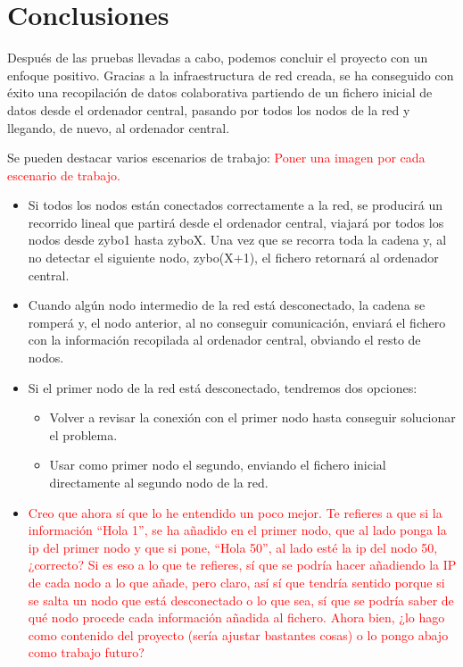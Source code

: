 \section{Conclusiones}
Después de las pruebas llevadas a cabo, podemos concluir el proyecto con un enfoque positivo. Gracias a la infraestructura de red creada, se ha conseguido con éxito una recopilación de datos colaborativa partiendo de un fichero inicial de datos desde el ordenador central, pasando por todos los nodos de la red y llegando, de nuevo, al ordenador central.

Se pueden destacar varios escenarios de trabajo: \textcolor{red}{Poner una imagen por cada escenario de trabajo.}
\begin{itemize}
	\item Si todos los nodos están conectados correctamente a la red, se producirá un recorrido lineal que partirá desde el ordenador central, viajará por todos los nodos desde zybo1 hasta zyboX. Una vez que se recorra toda la cadena y, al no detectar el siguiente nodo, zybo(X+1), el fichero retornará al ordenador central.
	\item Cuando algún nodo intermedio de la red está desconectado, la cadena se romperá y, el nodo anterior, al no conseguir comunicación, enviará el fichero con la información recopilada al ordenador central, obviando el resto de nodos.
	\item Si el primer nodo de la red está desconectado, tendremos dos opciones:
	\begin{itemize}
		\item Volver a revisar la conexión con el primer nodo hasta conseguir solucionar el problema.
		\item Usar como primer nodo el segundo, enviando el fichero inicial directamente al segundo nodo de la red.
	\end{itemize}
	\item \textcolor{red}{Creo que ahora sí que lo he entendido un poco mejor. Te refieres a que si la información ``Hola 1'', se ha añadido en el primer nodo, que al lado ponga la ip del primer nodo y que si pone, ``Hola 50'', al lado esté la ip del nodo 50, ¿correcto? Si es eso a lo que te refieres, sí que se podría hacer añadiendo la IP de cada nodo a lo que añade, pero claro, así sí que tendría sentido porque si se salta un nodo que está desconectado o lo que sea, sí que se podría saber de qué nodo procede cada información añadida al fichero. Ahora bien, ¿lo hago como contenido del proyecto (sería ajustar bastantes cosas) o lo pongo abajo como trabajo futuro?}
\end{itemize}


